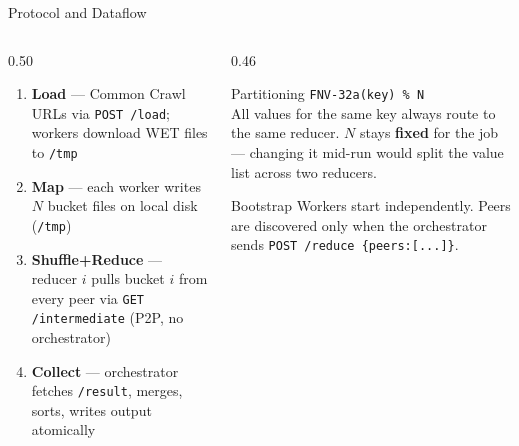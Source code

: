 \documentclass[aspectratio=169,10pt]{beamer}
\begin{document}
\begin{frame}{Protocol and Dataflow}
  \begin{columns}[T,onlytextwidth]
    \begin{column}{0.50\textwidth}
      \begin{enumerate}
        \item \textbf{Load} — Common Crawl URLs via \texttt{POST /load}; workers download WET files to \texttt{/tmp}
        \item \textbf{Map} — each worker writes $N$ bucket files on local disk (\texttt{/tmp})
        \item \textbf{Shuffle+Reduce} — reducer $i$ pulls bucket $i$ from every peer via \texttt{GET /intermediate} (P2P, no orchestrator)
        \item \textbf{Collect} — orchestrator fetches \texttt{/result}, merges, sorts, writes output atomically
      \end{enumerate}
    \end{column}
    \begin{column}{0.46\textwidth}
      \begin{block}{Partitioning}
        \texttt{FNV-32a(key) \% N}\\[0.4em]
        All values for the same key always route to the same reducer. $N$ stays \textbf{fixed} for the job — changing it mid-run would split the value list across two reducers.
      \end{block}
      \begin{block}{Bootstrap}
        Workers start independently. Peers are discovered only when the orchestrator sends \texttt{POST /reduce \{peers:[...]\}}.
      \end{block}
    \end{column}
  \end{columns}
\end{frame}
\end{document}
